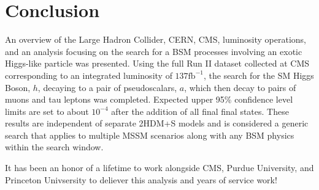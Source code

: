 \clearpage

\section{Conclusion}
\label{sec:conc}
An overview of the Large Hadron Collider, CERN, CMS, luminosity operations, and an analysis focusing on the search for a BSM processes involving an exotic Higgs-like particle was presented.
Using the full Run II dataset collected at CMS corresponding to an integrated luminosity of $\text{137}\text{fb}^{-1}$, the search for the SM Higgs Boson, $h$, decaying to a pair of pseudoscalars, $a$, which then decay to pairs of muons and tau leptons was completed. 
Expected upper 95\% confidence level limits are set to about $10^{-4}$ after the addition of all final final states. 
These results are independent of separate 2HDM+S models and is considered a generic search that applies to multiple MSSM scenarios along with any BSM physics within the search window. 

It has been an honor of a lifetime to work alongside CMS, Purdue University, and Princeton Univsersity to deliever this analysis and years of service work! 
